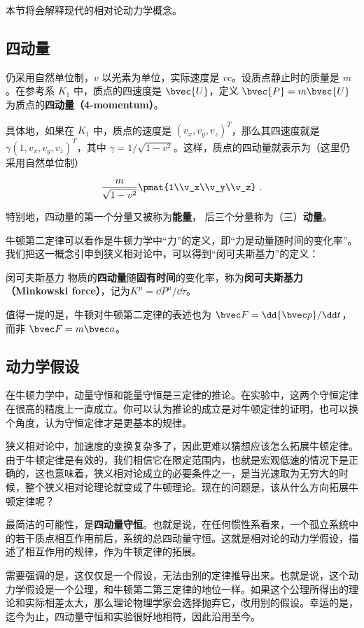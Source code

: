 本节将会解释现代的相对论动力学概念。

\subsection{四动量}

仍采用自然单位制，$v$ 以光素为单位，实际速度是 $vc$。设质点静止时的质量是 $m$。在参考系 $K_1$ 中，质点的四速度是 $\bvec{U}$，定义 $\bvec{P}=m\bvec{U}$ 为质点的\textbf{四动量（4-momentum）}。

具体地，如果在 $K_1$ 中，质点的速度是 $(v_x, v_y, v_z)^T$，那么其四速度就是 $\gamma(1, v_x, v_y, v_z)^T$，其中 $\gamma=1/\sqrt{1-v^2}$。这样，质点的四动量就表示为（这里仍采用自然单位制）

\begin{equation}
\frac{m}{\sqrt{1-v^2}}\pmat{1\\v_x\\v_y\\v_z}~.
\end{equation}

特别地，四动量的第一个分量又被称为\textbf{能量}， 后三个分量称为（三）\textbf{动量}。

牛顿第二定律可以看作是牛顿力学中“力”的定义，即“力是动量随时间的变化率”。我们把这一概念引申到狭义相对论中，可以得到“闵可夫斯基力”的定义：

\begin{definition}{闵可夫斯基力}
物质的\textbf{四动量}随\textbf{固有时间}的变化率，称为\textbf{闵可夫斯基力（Minkowski force）}，记为$K^{\mu}=\dd P^\mu/\dd\tau$。
\end{definition}

值得一提的是，牛顿对牛顿第二定律的表述也为 $\bvec F = \dd{\bvec p}/\dd t$，而非 $\bvec F = m\bvec a$。

\subsection{动力学假设}

在牛顿力学中，动量守恒和能量守恒是三定律的推论。在实验中，这两个守恒定律在很高的精度上一直成立。你可以认为推论的成立是对牛顿定律的证明，也可以换个角度，认为守恒定律才是更基本的规律。

狭义相对论中，加速度的变换复杂多了，因此更难以猜想应该怎么拓展牛顿定律。由于牛顿定律是有效的，我们相信它在限定范围内，也就是宏观低速的情况下是正确的，这也意味着，狭义相对论成立的必要条件之一，是当光速取为无穷大的时候，整个狭义相对论理论就变成了牛顿理论。现在的问题是，该从什么方向拓展牛顿定律呢？

最简洁的可能性，是\textbf{四动量守恒}。也就是说，在任何惯性系看来，一个孤立系统中的若干质点相互作用前后，系统的总四动量守恒。这就是相对论的动力学假设，描述了相互作用的规律，作为牛顿定律的拓展。

需要强调的是，这仅仅是一个假设，无法由别的定律推导出来。也就是说，这个动力学假设是一个公理，和牛顿第二第三定律的地位一样。如果这个公理所得出的理论和实际相差太大，那么理论物理学家会选择抛弃它，改用别的假设。幸运的是，迄今为止，四动量守恒和实验很好地相符，因此沿用至今。




